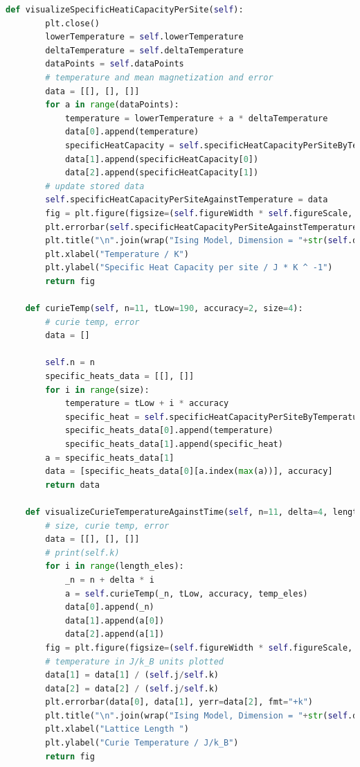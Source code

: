 \documentclass[%
showkeys,
bibnotes,
amsmath,amssymb,
floatfix,
]{revtex4-1}
\begin{document}
\begin{lstlisting}[language=Python]
    def visualizeSpecificHeatiCapacityPerSite(self):
        plt.close()
        lowerTemperature = self.lowerTemperature
        deltaTemperature = self.deltaTemperature
        dataPoints = self.dataPoints
        # temperature and mean magnetization and error
        data = [[], [], []]
        for a in range(dataPoints):
            temperature = lowerTemperature + a * deltaTemperature
            data[0].append(temperature)
            specificHeatCapacity = self.specificHeatCapacityPerSiteByTemperature(temperature)
            data[1].append(specificHeatCapacity[0])
            data[2].append(specificHeatCapacity[1])
        # update stored data
        self.specificHeatCapacityPerSiteAgainstTemperature = data
        fig = plt.figure(figsize=(self.figureWidth * self.figureScale, self.figureHeight * self.figureScale), dpi=self.figureDpi)
        plt.errorbar(self.specificHeatCapacityPerSiteAgainstTemperature[0], self.specificHeatCapacityPerSiteAgainstTemperature[1], yerr=self.specificHeatCapacityPerSiteAgainstTemperature[2], fmt="+k")
        plt.title("\n".join(wrap("Ising Model, Dimension = "+str(self.d)+", N = "+str(self.n)+", Tc = "+str(sigfig.round(float(self.tc), sigfigs=4))+"K, Time = "+str(self.steps)+"a.u.", 60)))
        plt.xlabel("Temperature / K")
        plt.ylabel("Specific Heat Capacity per site / J * K ^ -1")
        return fig

    def curieTemp(self, n=11, tLow=190, accuracy=2, size=4):
        # curie temp, error
        data = []

        self.n = n
        specific_heats_data = [[], []]
        for i in range(size):
            temperature = tLow + i * accuracy
            specific_heat = self.specificHeatCapacityPerSiteByTemperature(temperature)[0]
            specific_heats_data[0].append(temperature)
            specific_heats_data[1].append(specific_heat)
        a = specific_heats_data[1]
        data = [specific_heats_data[0][a.index(max(a))], accuracy]
        return data

    def visualizeCurieTemperatureAgainstTime(self, n=11, delta=4, length_eles=3, tLow=199, accuracy=0.6, temp_eles=10):
        # size, curie temp, error
        data = [[], [], []]
        # print(self.k)
        for i in range(length_eles):
            _n = n + delta * i
            a = self.curieTemp(_n, tLow, accuracy, temp_eles)
            data[0].append(_n)
            data[1].append(a[0])
            data[2].append(a[1])
        fig = plt.figure(figsize=(self.figureWidth * self.figureScale, self.figureHeight * self.figureScale), dpi=self.figureDpi)
        # temperature in J/k_B units plotted
        data[1] = data[1] / (self.j/self.k)
        data[2] = data[2] / (self.j/self.k)
        plt.errorbar(data[0], data[1], yerr=data[2], fmt="+k")
        plt.title("\n".join(wrap("Ising Model, Dimension = "+str(self.d)+", Tc = "+str(sigfig.round(float(self.tc), sigfigs=4))+"K, Time = "+str(self.steps)+"a.u.", 60)))
        plt.xlabel("Lattice Length ")
        plt.ylabel("Curie Temperature / J/k_B")
        return fig
    

\end{lstlisting}
\end{document}
